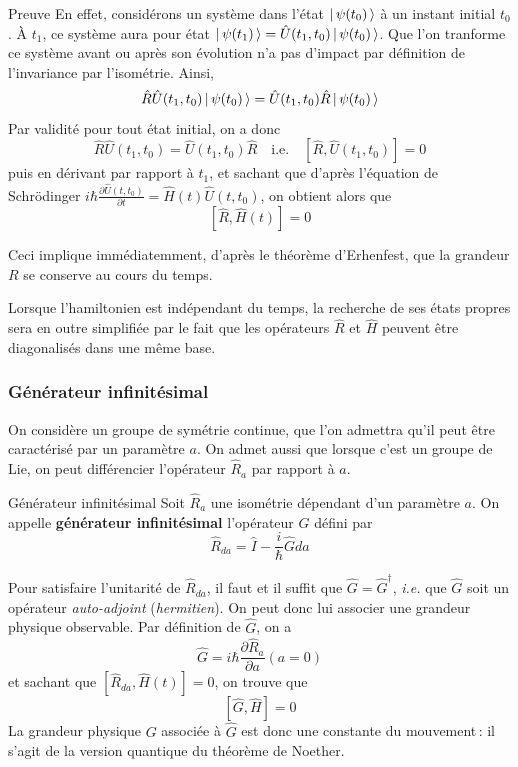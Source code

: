     \begin{demo}{Preuve}
        En effet, considérons un système dans l’état $\left| \, \psi(t_0) \, \right>$ à un instant initial $t_0$. À $t_1$, ce système aura pour état $\left| \, \psi(t_1) \, \right> = \hat{U}(t_1, t_0)\left| \, \psi(t_0) \, \right> $. Que l’on tranforme ce système avant ou après son évolution n’a pas d’impact par définition de l’invariance par l’isométrie. Ainsi, 
    \[ \hat{R}\hat{U}(t_1,t_0)\left| \, \psi(t_0) \, \right> = \hat{U}(t_1,t_0)\hat{R}\left| \, \psi(t_0) \, \right> \]
    Par validité pour tout état initial, on a donc 
    \[ \hat{R}\hat{U}(t_1,t_0) = \hat{U}(t_1,t_0)\hat{R} \quad \text{i.e.} \quad \left[\hat{R},\hat{U}(t_1,t_0)\right] = 0 \]
    puis en dérivant par rapport à $t_1$, et sachant que d’après l’équation de Schrödinger $i\hbar\frac{\partial \hat{U}(t,t_0)}{\partial t} = \hat{H}(t)\hat{U}(t,t_0)$, on obtient alors que 
    \[ \left[\hat{R},\hat{H}(t)\right] = 0 \]
    \end{demo}

    Ceci implique immédiatemment, d’après le théorème d’Erhenfest, que la grandeur $R$ se conserve au cours du temps. 

    Lorsque l’hamiltonien est indépendant du temps, la recherche de ses états propres sera en outre simplifiée par le fait que les opérateurs $\hat{R}$ et $\hat{H}$ peuvent être diagonalisés dans une même base.

        \subsubsection{Générateur infinitésimal}

    On considère un groupe de symétrie continue, que l’on admettra qu’il peut être caractérisé par un paramètre $a$. On admet aussi que lorsque c’est un groupe de Lie, on peut différencier l’opérateur $\hat{R}_a$ par rapport à $a$. 
    
    \begin{omed}{Générateur infinitésimal}
        Soit $\hat{R}_a$ une isométrie dépendant d’un paramètre $a$. On appelle \textbf{générateur infinitésimal} l’opérateur $\hat{G}$ défini par 
        \[ \hat{R}_{da} = \hat{I} - \frac{i}{\hbar} \hat{G}da \]   
    \end{omed}
    
    Pour satisfaire l’unitarité de $\hat{R}_{da}$, il faut et il suffit que $\hat{G} = \hat{G}^{\dagger}$, \textit{i.e.} que $\hat{G}$ soit un opérateur \textit{auto-adjoint} (\textit{hermitien}). On peut donc lui associer une grandeur physique observable. Par définition de $\hat{G}$, on a 
    \[ \hat{G} = i\hbar \frac{\partial \hat{R}_a}{\partial a} (a = 0) \]   
    et sachant que $\left[\hat{R}_{da},\hat{H}(t)\right] = 0$, on trouve que 
    \[ \left[\hat{G}, \hat{H}\right] = 0 \]
    La grandeur physique $G$ associée à $\hat{G}$ est donc une constante du mouvement : il s’agit de la version quantique du théorème de Noether.

